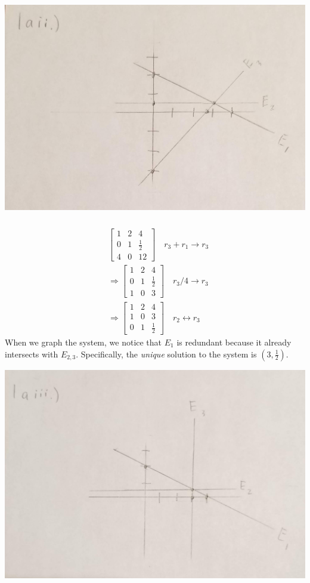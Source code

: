 \documentclass[]{article}
\begin{document}
\begin{center}
	\includegraphics[width=0.7\linewidth]{20190912_160638}
\end{center}

\subsubsection{}

\begin{align}
	&\left[
	\begin{array}{cc|c}
	1 & 2 & 4 \\
	0 & 1 & \frac{1}{2} \\
	4 & 0 & 12
	\end{array}
	\right] \quad r_3 + r_1 \to r_3 \\
	&\Rightarrow \left[
	\begin{array}{cc|c}
	1 & 2 & 4 \\
	0 & 1 & \frac{1}{2} \\
	1 & 0 & 3
	\end{array}
	\right]  \quad r_3 / 4 \to r_3 \\
	&\Rightarrow \left[
	\begin{array}{cc|c}
	1 & 2 & 4 \\
	1 & 0 & 3 \\
	0 & 1 & \frac{1}{2}
	\end{array}
	\right] \quad r_2 \longleftrightarrow r_3
\end{align}
When we graph the system, we notice that \(E_1\) is redundant because it already intersects with \(E_{2,3}\). Specifically, the \emph{unique} solution to the system is \((3, \frac{1}{2})\). \\

\begin{center}
	\includegraphics[width=0.7\linewidth]{20190912_160642}
\end{center}
\end{document}
